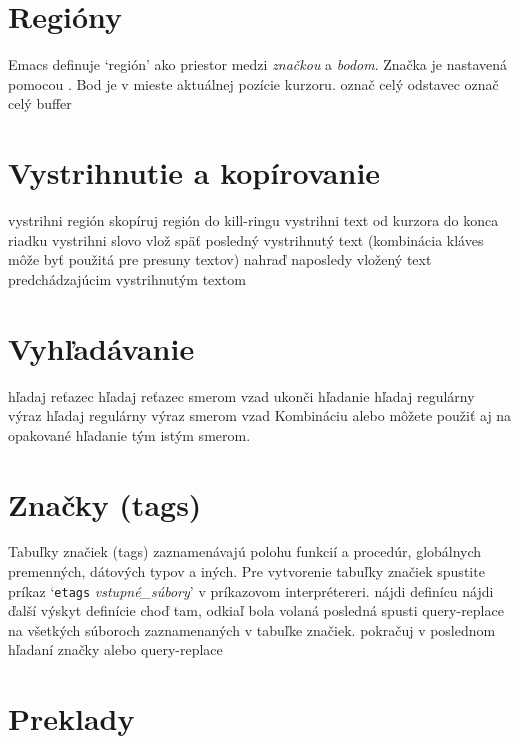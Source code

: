 \section{Regióny}

Emacs definuje `región' ako priestor medzi {\it značkou\/} a
{\it bodom}. Značka je nastavená pomocou .
Bod je v mieste aktuálnej pozície kurzoru.
\askip
{} označ celý odstavec
 označ celý buffer

\section{Vystrihnutie a kopírovanie}

 vystrihni región
 skopíruj región do kill-ringu
 vystrihni text od kurzora do konca riadku
 vystrihni slovo
 vlož späť posledný vystrihnutý text (kombinácia kláves 
          môže byť použitá pre presuny textov)
 nahraď naposledy vložený text predchádzajúcim vystrihnutým textom

\section{Vyhľadávanie}

 hľadaj reťazec
 hľadaj reťazec smerom vzad
 ukonči hľadanie
 hľadaj regulárny výraz
 hľadaj regulárny výraz smerom vzad
\askip
Kombináciu  alebo  môžete použiť aj na opakované hľadanie
tým istým smerom.

\section{Značky (tags)}

Tabuľky značiek (tags) zaznamenávajú polohu funkcií a procedúr, globálnych
premenných, dátových typov a iných. Pre vytvorenie tabuľky značiek spustite
príkaz `{\tt etags} {\it vstupné\_súbory}' v príkazovom interprétereri.
\askip
{} nájdi definícu
 nájdi ďalší výskyt definície
 choď tam, odkiaľ bola volaná posledná 
 spusti query-replace na všetkých súboroch
zaznamenaných v tabuľke značiek.
 pokračuj v poslednom hľadaní značky alebo query-replace

\section{Preklady}

